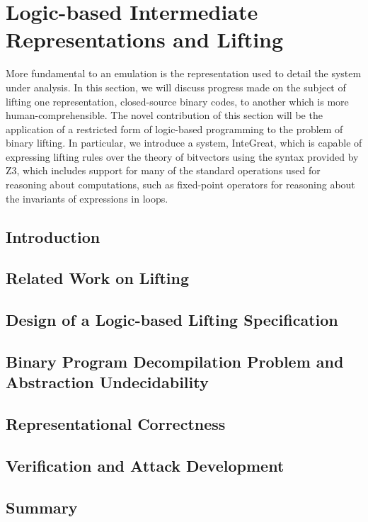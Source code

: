 \chapter{Logic-based Intermediate Representations and Lifting}
\label{chap:integreat}

More fundamental to an emulation is the representation used to detail the system under analysis.
In this section, we will discuss progress made on the subject of lifting one representation, closed-source binary codes, to another which is more human-comprehensible.
The novel contribution of this section will be the application of a restricted form of logic-based programming to the problem of binary lifting.
In particular, we introduce a system, InteGreat, which is capable of expressing lifting rules over the theory of bitvectors using the syntax provided by Z3, which includes support for many of the standard operations used for reasoning about computations, such as fixed-point operators for reasoning about the invariants of expressions in loops.

\section{Introduction}

\section{Related Work on Lifting}

\section{Design of a Logic-based Lifting Specification}

\section{Binary Program Decompilation Problem and Abstraction Undecidability}

\section{Representational Correctness}

\section{Verification and Attack Development}

\section{Summary}
